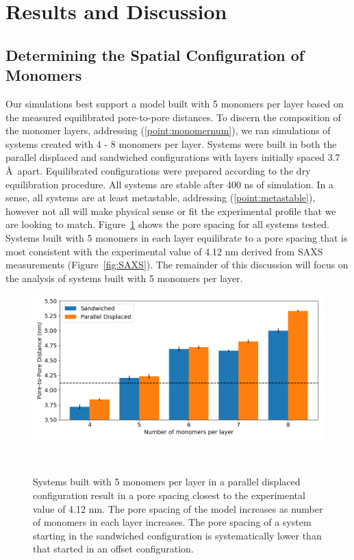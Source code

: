 \documentclass{article}
\begin{document}
  \section{Results and Discussion}
  
  \subsection{Determining the Spatial Configuration of Monomers}

  Our simulations best support a model built with 5 monomers per layer based on
  the measured equilibrated pore-to-pore distances. To discern the composition of
  the monomer layers, addressing (\ref{point:monomernum}), we ran simulations of
  systems created with 4 - 8 monomers per layer. Systems were built in both the
  parallel displaced and sandwiched configurations with layers initially spaced
  3.7 \AA~apart. Equilibrated configurations were prepared according to the dry
  equilibration procedure. All systems are stable after 400 ns of simulation. In
  a sense, all systems are at least metastable, addressing
  (\ref{point:metastable}), however not all will make physical sense or fit the
  experimental profile that we are looking to match. Figure~\ref{fig:p2p} shows
  the pore spacing for all systems tested. Systems built with 5 monomers in each
  layer equilibrate to a pore spacing that is most consistent with the
  experimental value of 4.12 nm derived from SAXS measurements
  (Figure~\ref{fig:SAXS}). The remainder of this discussion will focus on the
  analysis of systems built with 5 monomers per layer.

  \begin{figure}
	\centering
	\includegraphics[width=\linewidth]{p2p.png}
	\caption{Systems built with 5 monomers per layer in a parallel
		displaced configuration result in a pore spacing closest to the experimental
		value of 4.12 nm. The pore spacing of the model increases as number of monomers
		in each layer increases. The pore spacing of a system starting in the
		sandwiched configuration is systematically lower than that started in an offset
		configuration. }~\label{fig:p2p}
  \end{figure}  
\end{document}
